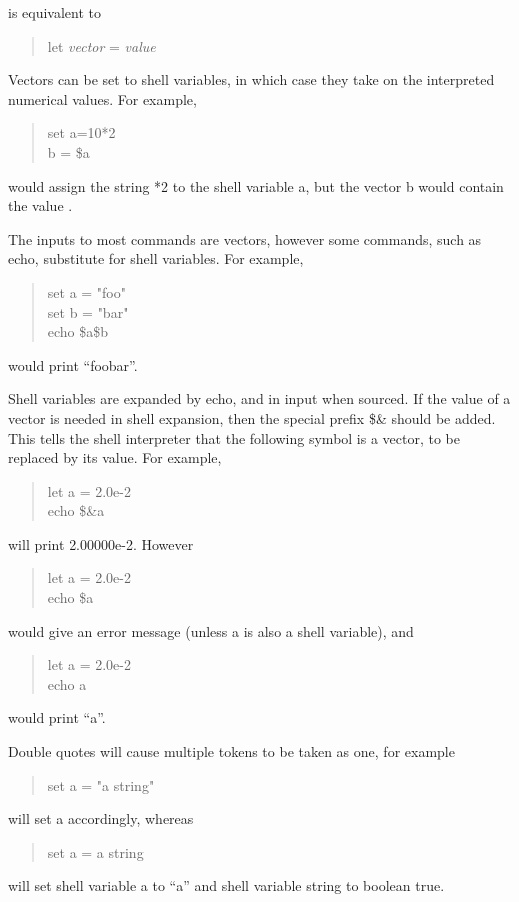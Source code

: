 is equivalent to
 
\begin{quote}
{\vt let} {\it vector} {\vt =} {\it value}
\end{quote}

Vectors can be set to shell variables, in which case they take on
the interpreted numerical values.  For example,
\begin{quote}\vt
set a=10*2\\
b = \$a
\end{quote}
would assign the string {*2} to the shell variable {\vt a}, but the
vector {\vt b} would contain the value {}.

The inputs to most commands are vectors, however some commands,
such as {\cb echo}, substitute for shell variables.  For example,
\begin{quote}\vt
set a = "foo"\\
set b = "bar"\\
echo \$a\$b
\end{quote}
would print ``{\vt foobar}''.

Shell variables are expanded by {\cb echo}, and in {\WRspice} input when
sourced.  If the value of a vector is needed in shell expansion,
then the special prefix {\vt \$\&} should be added.  This tells the
shell interpreter that the following symbol is a vector, to be
replaced by its value.  For example,
\begin{quote}\vt\rr
let a = 2.0e-2\\
echo \$\&a\\
\end{quote}
will print {\vt 2.00000e-2}.  However
\begin{quote}\vt\rr
let a = 2.0e-2\\
echo \$a\\
\end{quote}
would give an error message (unless {\vt a} is also a shell variable),
and
\begin{quote}\vt
let a = 2.0e-2\\
echo a
\end{quote}
would print ``{\vt a}''.

Double quotes will cause multiple tokens to be taken as one, for
example
\begin{quote}\vt
set a = "a string"
\end{quote}
will set {\vt a} accordingly, whereas
\begin{quote}\vt
set a = a string
\end{quote}
will set shell variable {\vt a} to ``{\vt a}'' and shell variable {\vt
string} to boolean true.

